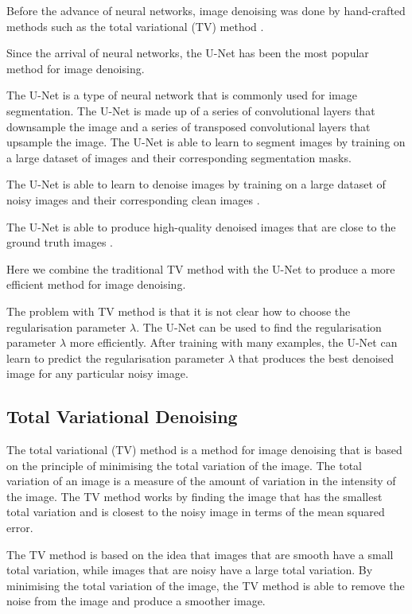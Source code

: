 \documentclass[12pt]{article}
\begin{document}
Before the advance of neural networks, image denoising was done by hand-crafted methods such as the total variational (TV) method \cite{rudin1992nonlinear}.

Since the arrival of neural networks, the U-Net has been the most popular method for image denoising.

The U-Net is a type of neural network that is commonly used for image segmentation.
The U-Net is made up of a series of convolutional layers that downsample the image and a series of transposed convolutional layers that upsample the image.
The U-Net is able to learn to segment images by training on a large dataset of images and their corresponding segmentation masks.

The U-Net is able to learn to denoise images by training on a large dataset of noisy images and their corresponding clean images \cite{ronneberger2015u}.

The U-Net is able to produce high-quality denoised images that are close to the ground truth images \cite{ronneberger2015u}.

Here we combine the traditional TV method with the U-Net to produce a more efficient method for image denoising.

The problem with TV method is that it is not clear how to choose the regularisation parameter $\lambda$.
The U-Net can be used to find the regularisation parameter $\lambda$ more efficiently.
After training with many examples, the U-Net can learn to predict the regularisation parameter $\lambda$ that produces the best denoised image for any particular noisy image.






\subsection{Total Variational Denoising}

The total variational (TV) method is a method for image denoising that is based on the principle of minimising the total variation of the image.
The total variation of an image is a measure of the amount of variation in the intensity of the image.
The TV method works by finding the image that has the smallest total variation and is closest to the noisy image in terms of the mean squared error.

The TV method is based on the idea that images that are smooth have a small total variation, while images that are noisy have a large total variation.
By minimising the total variation of the image, the TV method is able to remove the noise from the image and produce a smoother image.
\end{document}
